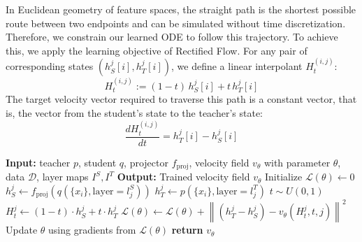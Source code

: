 \documentclass{article} %
\theoremstyle{definition}
\theoremstyle{remark}
\begin{document}
\begin{minipage}[t]{0.4\textwidth}
\vspace{0pt}
In Euclidean geometry of feature spaces, the straight path is the shortest possible route between two endpoints and can be simulated without time discretization. Therefore, we constrain our learned ODE to follow this trajectory. To achieve this, we apply the learning objective of Rectified Flow. For any pair of corresponding states $(h_S^{j}[i], h_T^{j}[i])$, we define a linear interpolant $H_t^{(i, j)}$:
\begin{equation}
H_t^{(i,j)} := (1-t)\, h_S^{j}[i] + t\, h_T^{j}[i]
\end{equation}
The target velocity vector required to traverse this path is a constant vector, that is, the vector from the student's state to the teacher's state: 
\begin{equation}
\frac{d H_t^{(i,j)}}{dt} = h_T^{j}[i] - h_S^{j}[i]
\end{equation}
\end{minipage}
\hfill
\begin{minipage}[t]{0.58\textwidth}
\vspace{-1em}
\begin{algorithm}[H]
  \caption{Training the Velocity Field $v_\theta$}
  \label{alg:train_v_theta}
  \begin{algorithmic}[1]
    \STATE \textbf{Input:} teacher $p$, student $q$, projector $f_{\text{proj}}$, velocity field $v_\theta$ with parameter $\theta$, data $\mathcal{D}$, layer maps $I^S, I^T$
    \STATE \textbf{Output:} Trained velocity field $v_\theta$
      \STATE Initialize $\mathcal{L}(\theta) \gets 0$
      \STATE $h_S^j \gets f_{\text{proj}}\!\left(q(\{x_i\}, \text{layer}=l_j^S)\right)$
      \STATE $h_T^j \gets p(\{x_i\}, \text{layer}=l_j^T)$
      \STATE $t \sim U(0,1)$
      \STATE $H_t^j \gets (1 - t)\cdot h_S^j + t\cdot h_T^j$
      \STATE $\mathcal{L}(\theta) \gets \mathcal{L}(\theta) + \left\| (h_T^j - h_S^j) - v_\theta(H_t^j, t, j) \right\|^2$
      \ENDFOR
      \STATE Update $\theta$ using gradients from $\mathcal{L}(\theta)$
    \ENDFOR
    \STATE \textbf{return} $v_\theta$
  \end{algorithmic}
\end{algorithm}
\end{minipage}
\end{document}
